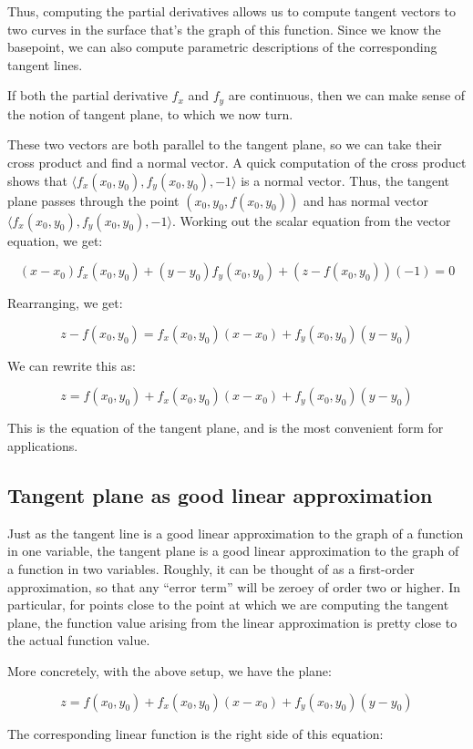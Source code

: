 \documentclass[10pt]{amsart}
\begin{document}
Thus, computing the partial derivatives allows us to compute tangent
vectors to two curves in the surface that's the graph of this
function. Since we know the basepoint, we can also compute parametric
descriptions of the corresponding tangent lines.

If both the partial derivative $f_x$ and $f_y$ are continuous, then we
can make sense of the notion of tangent plane, to which we now turn.

These two vectors are both parallel to the tangent plane, so we can
take their cross product and find a normal vector. A quick computation
of the cross product shows that $\langle f_x(x_0,y_0), f_y(x_0,y_0),
-1 \rangle$ is a normal vector. Thus, the tangent plane passes through
the point $(x_0,y_0,f(x_0,y_0))$ and has normal vector $\langle
f_x(x_0,y_0),f_y(x_0,y_0),-1 \rangle$. Working out the scalar equation
from the vector equation, we get:

$$(x - x_0)f_x(x_0,y_0) + (y - y_0)f_y(x_0,y_0) + (z - f(x_0,y_0))(-1) = 0$$

Rearranging, we get:

$$z - f(x_0,y_0) = f_x(x_0,y_0)(x - x_0) + f_y(x_0,y_0)(y - y_0)$$

We can rewrite this as:

$$z = f(x_0,y_0) + f_x(x_0,y_0)(x - x_0) + f_y(x_0,y_0)(y - y_0)$$

This is the equation of the tangent plane, and is the most convenient
form for applications.

\subsection{Tangent plane as good linear approximation}

Just as the tangent line is a good linear approximation to the graph
of a function in one variable, the tangent plane is a good linear
approximation to the graph of a function in two variables. Roughly, it
can be thought of as a first-order approximation, so that any ``error
term'' will be zeroey of order two or higher. In particular, for
points close to the point at which we are computing the tangent plane,
the function value arising from the linear approximation is pretty
close to the actual function value.

More concretely, with the above setup, we have the plane:

$$z = f(x_0,y_0) + f_x(x_0,y_0)(x - x_0) + f_y(x_0,y_0)(y - y_0)$$

The corresponding linear function is the right side of this equation:
\end{document}
